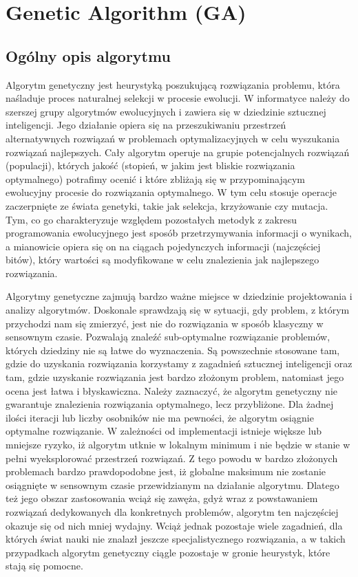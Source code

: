 \section{Genetic Algorithm (GA)}
\author{Filip Czajkowski}
\subsection{Ogólny opis algorytmu}
\par Algorytm genetyczny jest heurystyką poszukującą rozwiązania problemu, która naśladuje proces naturalnej selekcji w procesie ewolucji. W informatyce należy do szerszej grupy algorytmów ewolucyjnych i zawiera się w dziedzinie sztucznej inteligencji. Jego działanie opiera się na przeszukiwaniu przestrzeń alternatywnych rozwiązań w problemach optymalizacyjnych w celu wyszukania rozwiązań najlepszych. Cały algorytm operuje na grupie potencjalnych rozwiązań (populacji), których jakość (stopień, w jakim jest bliskie rozwiązania optymalnego) potrafimy ocenić i które zbliżają się w przypominającym ewolucyjny procesie do rozwiązania optymalnego. W tym celu stosuje operacje zaczerpnięte ze świata genetyki, takie jak selekcja, krzyżowanie czy mutacja. Tym, co go charakteryzuje względem pozostałych metodyk z zakresu programowania ewolucyjnego jest sposób przetrzymywania informacji o wynikach, a mianowicie opiera się on na ciągach pojedynczych informacji (najczęściej bitów), który wartości są modyfikowane w celu znalezienia jak najlepszego rozwiązania.
\par Algorytmy genetyczne zajmują bardzo ważne miejsce w dziedzinie projektowania i analizy algorytmów. Doskonale sprawdzają się w sytuacji, gdy problem, z którym przychodzi nam się zmierzyć, jest nie do rozwiązania w sposób klasyczny w sensownym czasie. Pozwalają znaleźć sub-optymalne rozwiązanie problemów, których dziedziny nie są łatwe do wyznaczenia. Są powszechnie stosowane tam, gdzie do uzyskania rozwiązania korzystamy z zagadnień sztucznej inteligencji oraz tam, gdzie uzyskanie rozwiązania jest bardzo złożonym problem, natomiast jego ocena jest łatwa i błyskawiczna. Należy zaznaczyć, że algorytm genetyczny nie gwarantuje znalezienia rozwiązania optymalnego, lecz przybliżone. Dla żadnej ilości iteracji lub liczby osobników nie ma pewności, że algorytm osiągnie optymalne rozwiązanie. W zależności od implementacji istnieje większe lub mniejsze ryzyko, iż algorytm utknie w lokalnym minimum i nie będzie w stanie w pełni wyeksplorować przestrzeń rozwiązań. Z tego powodu w bardzo złożonych problemach bardzo prawdopodobne jest, iż globalne maksimum nie zostanie osiągnięte w sensownym czasie przewidzianym na działanie algorytmu. Dlatego też jego obszar zastosowania wciąż się zawęża, gdyż wraz z powstawaniem rozwiązań dedykowanych dla konkretnych problemów, algorytm ten najczęściej okazuje się od nich mniej wydajny. Wciąż jednak pozostaje wiele zagadnień, dla których świat nauki nie znalazł jeszcze specjalistycznego rozwiązania, a w takich przypadkach algorytm genetyczny ciągle pozostaje w gronie heurystyk, które stają się pomocne.
